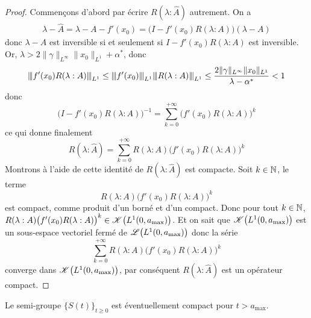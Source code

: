 \begin{proof}
    Commençons d'abord par écrire $R(\lambda : \hat{A})$ autrement. On a 
    \begin{eqnarray*}
        \lambda - \hat{A} = \lambda - A - f'(x_0) = \big(I-f'(x_0)R(\lambda : A)\big)(\lambda - A)
    \end{eqnarray*}
    donc $\lambda - \hat{A}$ est inversible si et seulement si $I-f'(x_0)R(\lambda : A)$ est inversible. Or, $\lambda >2\|\gamma\|_{L^\infty}\|x_0\|_{L^1}+\alpha^*$, donc
    \begin{eqnarray*}
        {\left\vert\kern-0.25ex\left\vert \kern-0.25ex\left\vert f'(x_0)R(\lambda : A) \right\vert\kern-0.25ex\right\vert\kern-0.25ex\right\vert}_{L^1} \leq {\left\vert\kern-0.25ex\left\vert \kern-0.25ex\left\vert f'(x_0) \right\vert\kern-0.25ex\right\vert\kern-0.25ex\right\vert}_{L^1}{\left\vert\kern-0.25ex\left\vert \kern-0.25ex\left\vert R(\lambda : A) \right\vert\kern-0.25ex\right\vert\kern-0.25ex\right\vert}_{L^1}
        \leq \frac{2\|\gamma\|_{L^\infty}\|x_0\|_{L^1}}{\lambda - \alpha^*} < 1
    \end{eqnarray*}
    donc 
    \begin{equation*}
        \big(I-f'(x_0)R(\lambda : A)\big)^{-1} = \sum_{k=0}^{+\infty}\big(f'(x_0)R(\lambda : A)\big)^k
    \end{equation*}
    ce qui donne finalement
    \begin{equation*}
        R(\lambda : \hat{A}) = \sum_{k=0}^{+\infty}R(\lambda:A)\big(f'(x_0)R(\lambda:A)\big)^k
    \end{equation*}
    Montrons à l'aide de cette identité de $R(\lambda : \hat{A})$ est compacte. Soit $k \in \mathbb{N}$, le terme 
    \begin{equation*}
        R(\lambda : A)\big(f'(x_0)R(\lambda:A)\big)^k
    \end{equation*}
    est compact, comme produit d'un borné et d'un compact. Donc pour tout $k \in \mathbb{N}$, $R(\lambda : A)\big(f'(x_0)R(\lambda:A)\big)^k \in \mathscr{K}\big(L^1(0,a_{\max})\big)$. Et on sait que $\mathscr{K}\big(L^1(0,a_{\max})\big)$ est un sous-espace vectoriel fermé de $\mathscr{L}\big(L^1(0,a_{\max})\big)$ donc la série 
    \begin{equation*}
        \sum_{k=0}^{+\infty}R(\lambda:A)\big(f'(x_0)R(\lambda:A)\big)^k
    \end{equation*}
    converge dans $\mathscr{K}\big(L^1(0,a_{\max})\big)$, par conséquent $R(\lambda : \hat{A})$ est un opérateur compact.
\end{proof}

\begin{proposition}
    Le semi-groupe $\big\{S(t)\big\}_{t \geq 0}$ est éventuellement compact pour $t > a_{\max}$.
\end{proposition}

